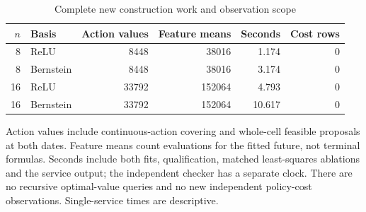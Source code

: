 \begin{table}[htbp]
\centering
\caption{Complete new construction work and observation scope}\label{tab:work73}
{\small\setlength{\tabcolsep}{4pt}
\begin{tabular}{rlrrrr}
\hline
$n$ & Basis & Action values & Feature means & Seconds & Cost rows \\
\hline
8 & ReLU & 8448 & 38016 & 1.174 & 0 \\
8 & Bernstein & 8448 & 38016 & 3.174 & 0 \\
16 & ReLU & 33792 & 152064 & 4.793 & 0 \\
16 & Bernstein & 33792 & 152064 & 10.617 & 0 \\
\hline
\end{tabular}}
\par\smallskip
{\footnotesize Action values include continuous-action covering and whole-cell feasible proposals at both dates. Feature means count evaluations for the fitted future, not terminal formulas. Seconds include both fits, qualification, matched least-squares ablations and the service output; the independent checker has a separate clock. There are no recursive optimal-value queries and no new independent policy-cost observations. Single-service times are descriptive.}
\end{table}
